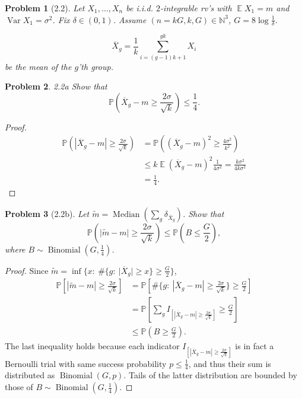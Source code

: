 \documentclass{article}
\newtheorem{problem}{Problem}
\newcommand{\expect}{\operatorname{\mathbb{E}}}
\begin{document}
\begin{problem}[2.2]
Let \( X_1, \ldots, X_n \)
be i.i.d. \( 2 \)-integrable rv's
with \( \expect X_1 = m \)
and \( \operatorname{Var}X_1 = \sigma^2 \).
Fix \( \delta\in(0,1) \).
Assume \( (n=kG, k, G)\in \mathbb{N}^3 \),
\( G = 8\log\frac1\delta \).

\[
\overline{X}_g = \frac1k \sum_{i=(g-1)k+1}^{gk} X_i
\]
be the mean of the \( g \)'th group.
\end{problem}
\begin{problem}{2.2a}
Show that \[
\mathbb{P}(\overline{X}_g - m \geq \frac{2\sigma}{\sqrt{k}}) \leq \frac14.
\]
\end{problem}
\begin{proof}
\[\begin{split}
\mathbb{P}\left(|\overline{X}_g - m| \geq \frac{2\sigma}{\sqrt{k}}\right)
&= \mathbb{P}\left((\overline{X}_g - m)^2 \geq \frac{4\sigma^2}{k^2}\right) \\
&\leq k\expect(\overline{X}_g - m)^2\frac{1}{4\sigma^2} = \frac{k\sigma^2}{4k\sigma^2} \\
&= \frac14.
\end{split}\]

\end{proof}

\begin{problem}[2.2b]
Let \( \tilde{m} = \operatorname{Median}(\sum_g \delta_{\overline{X}_g}) \).
Show that
\[
\mathbb{P}\left(\lvert\tilde{m} - m\rvert \geq \frac{2\sigma}{\sqrt{k}}\right)
\leq \mathbb{P}(B \leq \frac{G}{2}),
\]
where \( B\sim\operatorname{Binomial}(G, \frac14) \).
\end{problem}
\begin{proof}
Since \( \tilde{m} = \inf\{x:~\#\{g:~\lvert\overline{X}_g\rvert\geq x\} \geq \frac{G}{2}\} \),
\[\begin{split}
\mathbb{P}\left[|\tilde{m} - m| \geq \frac{2\sigma}{\sqrt{k}} \right]
&= \mathbb{P}\left[
\#\{g:~|\overline{X}_g - m|\geq \frac{2\sigma}{\sqrt{k}}\} \geq \frac{G}{2}
\right]
\\
&= \mathbb{P}\left[
\sum_g I_{[|\overline{X}_g - m|\geq \frac{2\sigma}{\sqrt{k}}]} \geq \frac{G}{2}
\right]
\\
&\leq \mathbb{P}(B\geq \frac{G}{2}).
\end{split}\]
The last inequality holds because
each indicator \( I_{[|\overline{X}_g - m|\geq \frac{2\sigma}{\sqrt{k}}]} \)
is in fact a Bernoulli trial with same success probability \( p\leq\frac14 \),
and thus their sum is distributed as \( \operatorname{Binomial}(G, p) \).
Tails of the latter distribution are bounded by those
of \( B\sim\operatorname{Binomial}(G, \frac14) \).
\end{proof}
\end{document}
